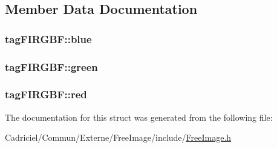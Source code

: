 \subsection{Member Data Documentation}
\hypertarget{structtag_f_i_r_g_b_f_a18cf7966f5a4f5ffd0820aa5a18f8362}{
\subsubsection[{blue}]{ tag\-F\-I\-R\-G\-B\-F\-::blue}}\label{structtag_f_i_r_g_b_f_a18cf7966f5a4f5ffd0820aa5a18f8362}
\hypertarget{structtag_f_i_r_g_b_f_ac062604601e6b4da84deb02a29287774}{
\subsubsection[{green}]{ tag\-F\-I\-R\-G\-B\-F\-::green}}\label{structtag_f_i_r_g_b_f_ac062604601e6b4da84deb02a29287774}
\hypertarget{structtag_f_i_r_g_b_f_ab15fa4a5afe84d7d66e598a1c1a17ffa}{
\subsubsection[{red}]{ tag\-F\-I\-R\-G\-B\-F\-::red}}\label{structtag_f_i_r_g_b_f_ab15fa4a5afe84d7d66e598a1c1a17ffa}


The documentation for this struct was generated from the following file\-:\begin{DoxyCompactItemize}
\item 
Cadriciel/\-Commun/\-Externe/\-Free\-Image/include/\hyperlink{_free_image_8h}{Free\-Image.\-h}\end{DoxyCompactItemize}
